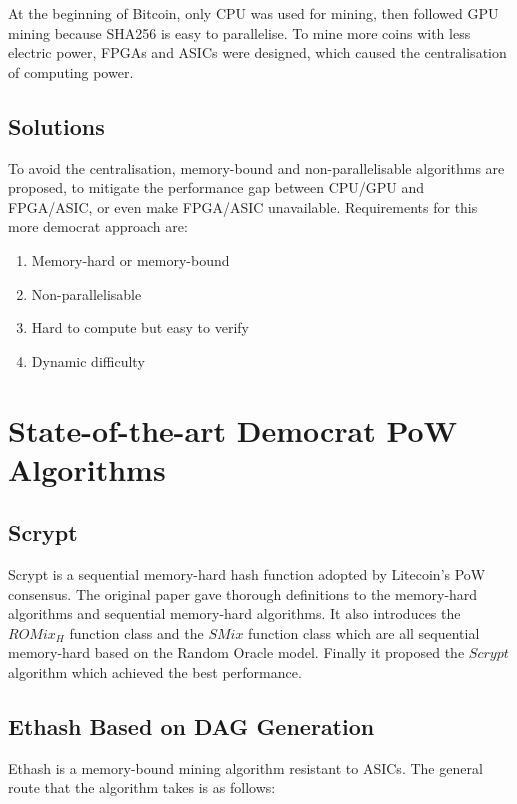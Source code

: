 \documentclass[11pt]{article}
\begin{document}
At the beginning of Bitcoin, only CPU was used for mining, then followed GPU mining because SHA256 is easy to parallelise. To mine more coins with less electric power, FPGAs and ASICs were designed, which caused the centralisation of computing power. 

\subsection{Solutions}

To avoid the centralisation, memory-bound and non-parallelisable algorithms are proposed,  to mitigate the performance gap between CPU/GPU and FPGA/ASIC, or even make FPGA/ASIC unavailable. Requirements for this more democrat approach are:

\begin{enumerate}
\item Memory-hard or memory-bound
\item Non-parallelisable
\item Hard to compute but easy to verify
\item Dynamic difficulty
\end{enumerate}

\section{State-of-the-art Democrat PoW Algorithms}

\subsection{Scrypt}

Scrypt\cite{scrypt} is a sequential memory-hard hash function adopted by Litecoin's PoW consensus. The original paper gave thorough definitions to the memory-hard algorithms and sequential memory-hard algorithms. It also introduces the $ROMix_{H}$ function class and the $SMix$ function class which are all sequential memory-hard based on the Random Oracle model\cite{canetti2004random}. Finally it proposed the $Scrypt$ algorithm which achieved the best performance.

\subsection{Ethash Based on DAG Generation}

Ethash is a memory-bound mining algorithm resistant to ASICs\cite{ethash}. The general route that the algorithm takes is as follows:
\end{document}

